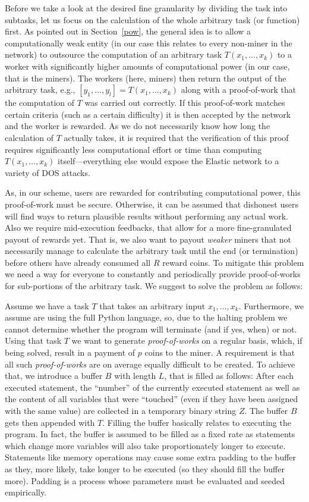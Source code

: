 \documentclass{sig-alternate}
\begin{document}
Before we take a look at the desired fine granularity by dividing the task into subtasks, let us focus on the calculation of the whole arbitrary task (or function) first.
As pointed out in Section~\ref{pow}, the general idea is to allow a computationally weak entity (in our case this relates to every non-miner in the network) to outsource the computation of an arbitrary task $T(x_1,\ldots,x_k)$ to a worker with significantly higher amounts of computational power (in our case, that is the miners).
The workers (here, miners) then return the output of the arbitrary task, e.g., $[y_1,\ldots,y_l] = T(x_1,\ldots,x_k)$ along with a proof-of-work that the computation of $T$ was carried out correctly.
If this proof-of-work matches certain criteria (such as a certain difficulty) it is then accepted by the network and the worker is rewarded.
As we do not necessarily know how long the calculation of $T$ actually takes, it is required that the verification of this proof requires significantly less computational effort or time than
computing $T(x_1,\ldots,x_k)$ itself---everything else would expose the Elastic network to a variety of DOS attacks.

As, in our scheme, users are rewarded for contributing computational power, this proof-of-work must be secure. Otherwise, it can be assumed that dishonest users will find ways to return plausible results without performing any actual work. 
Also we require mid-execution feedbacks, that allow for a more fine-granulated payout of rewards yet. That is, we also want to payout \emph{weaker} miners that not necessarily manage to calculate the arbitrary task until the end (or termination) before others have already consumed all $R$ reward coins. To mitigate this problem we need a way for everyone to constantly and periodically provide proof-of-works for sub-portions of the arbitrary task.
We suggest to solve the problem as follows: 

Assume we have a task $T$ that takes an arbitrary input $x_1,\ldots,x_k$. Furthermore, we assume are using the full Python language, so, due to the halting problem we cannot determine whether the program will terminate (and if yes, when) or not.
Using that task $T$ we want to generate \emph{proof-of-works} on a regular basis, which, if being solved, result in a payment of $p$ coins to the miner. A requirement is that all such \emph{proof-of-works} are on average equally difficult to be created.
To achieve that, we introduce a buffer $B$ with length $L$, that is filled as follows:
After each executed statement, the ``number'' of the currently executed statement as well as the content of all variables that were ``touched'' (even if they have been assigned with the same value) are collected in a temporary binary string $Z$. The buffer $B$ gets then appended with $T$.
Filling the buffer basically relates to executing the program. In fact, the buffer is assumed to be filled as a fixed rate as statements which change more variables will also take proportionately longer to execute. Statements like memory operations may cause some extra padding to the buffer as they, more likely, take longer to be executed (so they should fill the buffer more). Padding is a process whose parameters must be evaluated and seeded empirically.
\end{document}
